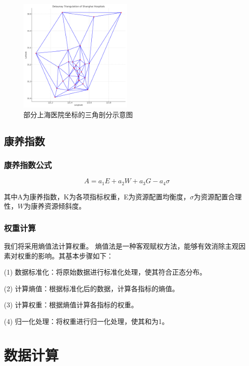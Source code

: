 \documentclass[12pt,a4paper]{article}
\begin{document}
\begin{multicols}{2}
\begin{figure}[H] %
\centering %
\includegraphics[width=0.5\textwidth]{images/delaunay_triangulation_shanghai.png} %
\caption{部分上海医院坐标的三角剖分示意图} %
\label{Fig.main2} %
\end{figure}


\subsection{康养指数}

\subsubsection{康养指数公式}

\[
A = a_1E + a_2W + a_3G - a_4\sigma
\]

其中A为康养指数，K为各项指标权重，E为资源配置均衡度，$\sigma$为资源配置合理性，$W$为康养资源倾斜度。

\subsubsection{权重计算}

我们将采用熵值法\cite{02}计算权重。
熵值法是一种客观赋权方法，能够有效消除主观因素对权重的影响。其基本步骤如下：

(1) 数据标准化：将原始数据进行标准化处理，使其符合正态分布。

(2) 计算熵值：根据标准化后的数据，计算各指标的熵值。

(3) 计算权重：根据熵值计算各指标的权重。

(4) 归一化处理：将权重进行归一化处理，使其和为1。

\section{数据计算}


\end{multicols}
\end{document}
